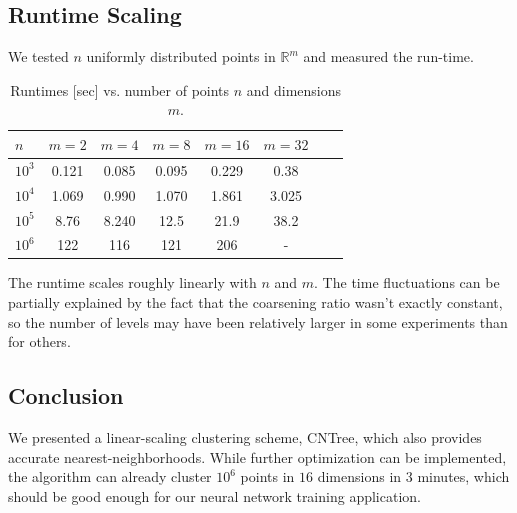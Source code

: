 \documentclass[11pt]{article}
\newcommand{\Real}{\mathbb{R}}
\begin{document}
\subsection{Runtime Scaling}
We tested $n$ uniformly distributed points in $\Real^m$ and measured the run-time.
\begin{table}
\begin{tabular}{l*{6}{c}r}
$n$ & $m = 2$ & $m = 4$ & $m = 8$ & $m = 16$ & $m = 32$ \\
\hline
\hline
$10^3$ & 0.121 & 0.085 & 0.095 & 0.229 & 0.38  \\
$10^4$ & 1.069 & 0.990 & 1.070 & 1.861 & 3.025 \\
$10^5$ & 8.76  & 8.240 & 12.5  & 21.9  & 38.2  \\ 
$10^6$ & 122   & 116   & 121   & 206   & -     \\ 
	\end{tabular}
	\caption{Runtimes [sec] vs. number of points $n$ and dimensions $m$.}
\end{table}
The runtime scales roughly linearly with $n$ and $m$. The time fluctuations can be partially explained by the fact that the coarsening ratio wasn't exactly constant, so the number of levels may have been relatively larger in some experiments than for others.

\subsection{Conclusion}
We presented a linear-scaling clustering scheme, CNTree, which also provides accurate nearest-neighborhoods. While further optimization can be implemented, the algorithm can already cluster $10^6$ points in $16$ dimensions in $3$ minutes, which should be good enough for our neural network training application.



\end{document}
